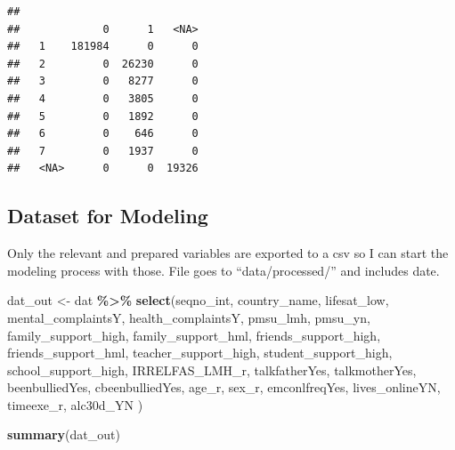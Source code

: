 \documentclass[
]{article}
\newenvironment{Shaded}{\begin{snugshade}}{\end{snugshade}}
\newcommand{\FunctionTok}[1]{\textcolor[rgb]{0.13,0.29,0.53}{\textbf{#1}}}
\newcommand{\NormalTok}[1]{#1}
\newcommand{\OtherTok}[1]{\textcolor[rgb]{0.56,0.35,0.01}{#1}}
\newcommand{\SpecialCharTok}[1]{\textcolor[rgb]{0.81,0.36,0.00}{\textbf{#1}}}
\begin{document}
\begin{verbatim}
##       
##             0      1   <NA>
##   1    181984      0      0
##   2         0  26230      0
##   3         0   8277      0
##   4         0   3805      0
##   5         0   1892      0
##   6         0    646      0
##   7         0   1937      0
##   <NA>      0      0  19326
\end{verbatim}

\subsection{Dataset for Modeling}\label{dataset-for-modeling}

Only the relevant and prepared variables are exported to a csv so I can
start the modeling process with those. File goes to ``data/processed/''
and includes date.

\begin{Shaded}
\begin{Highlighting}[]
\NormalTok{dat\_out }\OtherTok{\textless{}{-}}\NormalTok{ dat }\SpecialCharTok{\%\textgreater{}\%}
  \FunctionTok{select}\NormalTok{(seqno\_int,}
\NormalTok{         country\_name,}
\NormalTok{         lifesat\_low, }
\NormalTok{         mental\_complaintsY, }
\NormalTok{         health\_complaintsY, }
\NormalTok{         pmsu\_lmh, }
\NormalTok{         pmsu\_yn, }
\NormalTok{         family\_support\_high, }
\NormalTok{         family\_support\_hml, }
\NormalTok{         friends\_support\_high, }
\NormalTok{         friends\_support\_hml, }
\NormalTok{         teacher\_support\_high,}
\NormalTok{         student\_support\_high,}
\NormalTok{         school\_support\_high,}
\NormalTok{         IRRELFAS\_LMH\_r, }
\NormalTok{         talkfatherYes, }
\NormalTok{         talkmotherYes, }
\NormalTok{         beenbulliedYes, }
\NormalTok{         cbeenbulliedYes, }
\NormalTok{         age\_r, }
\NormalTok{         sex\_r,}
\NormalTok{         emconlfreqYes,}
\NormalTok{         lives\_onlineYN,}
\NormalTok{         timeexe\_r,}
\NormalTok{         alc30d\_YN}
\NormalTok{         )}

\FunctionTok{summary}\NormalTok{(dat\_out)}
\end{Highlighting}
\end{Shaded}
\end{document}
